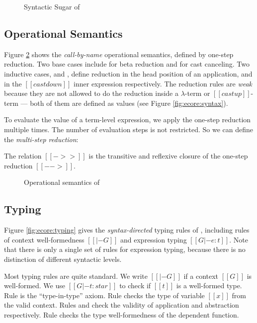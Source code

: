 \begin{figure}
    \resizebox{\columnwidth}{!}{$\ottcoresugar$}
    \caption{Syntactic Sugar of \ecore}
    \label{fig:ecore:sugar}
\end{figure}

\subsection{Operational Semantics}\label{sec:ecore:opsem}

Figure \ref{fig:ecore:opsem} shows the \emph{call-by-name} operational
semantics, defined by one-step reduction. Two base cases include
 for beta reduction and  for
cast canceling. Two inductive cases,  and
, define reduction in the head position of an
application, and in the $[[castdown]]$ inner expression respectively.
The reduction rules are \emph{weak} because they are not allowed to do
the reduction inside a $\lambda$-term or $[[castup]]$-term --- both of
them are defined as values (see Figure \ref{fig:ecore:syntax}).

To evaluate the value of a term-level expression, we apply the
one-step reduction multiple times. The number of evaluation steps is
not restricted. So we can define the \emph{multi-step reduction}:

\begin{dfn}
    The relation $[[->>]]$ is the transitive and reflexive closure of
    the one-step reduction $[[-->]]$.
\end{dfn}

\begin{figure}
    \ottdefnstep{}
    \caption{Operational semantics of \ecore}
    \label{fig:ecore:opsem}
\end{figure}

\subsection{Typing}\label{sec:ecore:type}

Figure \ref{fig:ecore:typing} gives the \emph{syntax-directed} typing
rules of \ecore, including rules of context well-formedness $[[|- G]]$
and expression typing $[[G |- e : t]]$. Note that there is only a
single set of rules for expression typing, because there is no
distinction of different syntactic levels.

Most typing rules are quite standard. We write $[[|- G]]$ if a context
$[[G]]$ is well-formed. We use $[[G |- t : star]]$ to check if $[[t]]$ is a
well-formed type. Rule  is the ``type-in-type''
axiom. Rule  checks the type of variable $[[x]]$ from
the valid context. Rules  and  check
the validity of application and abstraction respectively. Rule 
checks the type well-formedness of the dependent function.

